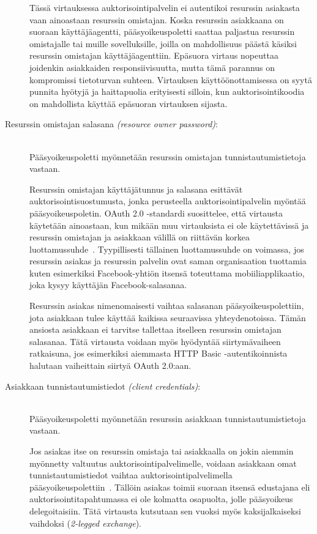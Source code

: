 \documentclass[finnish,gradu]{tktltiki}
\begin{document}
\begin{description}
  Tässä virtauksessa auktorisointipalvelin ei autentikoi resurssin asiakasta vaan ainoastaan resurssin omistajan. Koska resurssin asiakkaana on suoraan käyttäjäagentti, pääsyoikeuspoletti saattaa paljastua resurssin omistajalle tai muille sovelluksille, joilla on mahdollisuus päästä käsiksi resurssin omistajan käyttäjäagenttiin. Epäsuora virtaus nopeuttaa joidenkin asiakkaiden responsiivisuutta, mutta tämä parannus on kompromissi tietoturvan suhteen. Virtauksen käyttöönottamisessa on syytä punnita hyötyjä ja haittapuolia erityisesti silloin, kun auktorisointikoodia on mahdollista käyttää epäsuoran virtauksen sijasta.


   \item[Resurssin omistajan salasana \emph{(resource owner password)}:] \hfill \\
   Pääsyoikeuspoletti myönnetään resurssin omistajan tunnistautumistietoja vastaan.

   Resurssin omistajan käyttäjätunnus ja salasana esittävät auktorisointisuostumusta, jonka perusteella auktorisointipalvelin myöntää pääsyoikeuspoletin. OAuth 2.0 -standardi suosittelee, että virtausta käytetään ainoastaan, kun mikään muu virtauksista ei ole käytettävissä ja resurssin omistajan ja asiakkaan välillä on riittävän korkea luottamussuhde~\cite{ietf_oauth2}. Tyypillisesti tällainen luottamussuhde on voimassa, jos resurssin asiakas ja resurssin palvelin ovat saman organisaation tuottamia kuten esimerkiksi Facebook-yhtiön itsensä toteuttama mobiiliapplikaatio, joka kysyy käyttäjän Facebook-salasanaa.

   Resurssin asiakas nimenomaisesti vaihtaa salasanan pääsyoikeuspolettiin, jota asiakkaan tulee käyttää kaikissa seuraavissa yhteydenotoissa. Tämän ansiosta asiakkaan ei tarvitse tallettaa itselleen resurssin omistajan salasanaa. Tätä virtausta voidaan myös hyödyntää siirtymävaiheen ratkaisuna, jos esimerkiksi aiemmasta HTTP Basic -autentikoinnista halutaan vaiheittain siirtyä OAuth 2.0:aan.

   \item[Asiakkaan tunnistautumistiedot \emph{(client credentials)}:] \hfill \\
   Pääsyoikeuspoletti myönnetään resurssin asiakkaan tunnistautumistietoja vastaan.

  Jos asiakas itse on resurssin omistaja tai asiakkaalla on jokin aiemmin myönnetty valtuutus auktorisointipalvelimelle, voidaan asiakkaan omat tunnistautumistiedot vaihtaa auktorisointipalvelimella pääsyoikeuspolettiin~\cite{ietf_oauth2}. Tällöin asiakas toimii suoraan itsensä edustajana eli auktorisointitapahtumassa ei ole kolmatta osapuolta, jolle pääsyoikeus delegoitaisiin. Tätä virtausta kutsutaan sen vuoksi myös kaksijalkaiseksi vaihdoksi (\emph{2-legged exchange}).

   \end{description}
\end{document}
